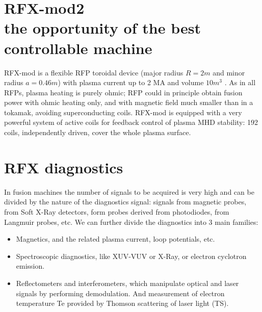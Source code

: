 
\section{RFX-mod2 \\ \small{the opportunity of the best controllable machine}}
\cite{SONATO2003161}
\cite{doi:10.1063/1.4806765}
\cite{martin_RFX_overview}


RFX-mod is a flexible \ac{RFP} toroidal device (major radius $R=2 m$ and minor radius $a=0.46 m$) with plasma current up to 2 MA and volume $10 m^3$ \cite{SONATO200597}. As in all RFPs, plasma heating is purely ohmic; \acl{RFP} could in principle obtain fusion power with ohmic heating only, and with magnetic field much smaller than in a tokamak, avoiding superconducting coils. RFX-mod is equipped with a very powerful system of active coils for feedback control of plasma MHD stability: 192 coils, independently driven, cover the whole plasma surface.


\section{RFX diagnostics}
In fusion machines the number of signals to be acquired is very high and can be divided by the nature of the diagnostics signal:
signals from magnetic probes, from Soft X-Ray detectors, form probes derived from photodiodes, from Langmuir probes, etc.
%
We can further divide the diagnostics into 3 main families:
\begin{itemize}
    \item Magnetics, and the related plasma current, loop potentials, etc.
    \item Spectroscopic diagnostics, like XUV-VUV or X-Ray, or electron cyclotron emission. 
    \item Reflectometers and interferometers, which manipulate optical and laser signals by performing demodulation.    
          And measurement of electron temperature Te provided by Thomson scattering of laser light (TS).
\end{itemize}


